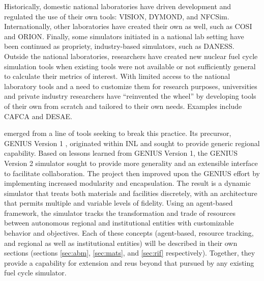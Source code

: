 Historically, domestic national laboratories have driven development and
regulated the use of their own tools:
\gls{VISION}\cite{jacobson_verifiable_2010},
\gls{DYMOND}\cite{yacout_modeling_2005}, and
\gls{NFCSim}\cite{schneider_nfcsim:_2005,allan_guidance_2008}.  Internationally,
other laboratories have created their own as well, such as
\gls{COSI}\cite{boucher_cosi_2005,boucher_cosi:_2006,meyer_new_2009,coquelet-pascal_comparison_2011}
and ORION\cite{worrall_scenario_2007}.  Finally, some simulators initiated in a national lab setting have
been continued as propriety, industry-based simulators, such as
\gls{DANESS}\cite{van_den_durpel_daness_2009}.  Outside the national laboratories,
researchers have created new nuclear fuel cycle simulation tools when existing
tools were not available or not sufficiently general to calculate their metrics
of interest.  With limited access to the
national laboratory tools and a need to customize them for research purposes,
universities and private industry researchers have ``reinvented the wheel'' by
developing tools of their own from scratch and tailored to their own needs.
Examples include \gls{CAFCA}\cite{guerin_benchmark_2009} and
\gls{DESAE}\cite{andrianova_desae_2008,mccarthy_benchmark_2012,allan_guidance_2008}.

\Cyclus emerged from a line of tools seeking to break this practice.  Its
precursor, \gls{GENIUS} Version 1
\cite{dunzik-gougar_global_2007,jain_transitioning_2006}, originated within
\gls{INL} and sought to provide generic regional capability.  Based on lessons
learned from \gls{GENIUS} Version 1, the \gls{GENIUS} Version 2
\cite{oliver_studying_2009,huff_geniusv2_2009} simulator sought to provide more
generality and an extensible interface to facilitate collaboration.  The \Cyclus
project then improved upon the \gls{GENIUS} effort by implementing increased
modularity and encapsulation.  The result is a dynamic simulator that treats
both materials and facilities discretely, with an architecture that permits
multiple and variable levels of fidelity. Using an agent-based framework, the
simulator tracks the transformation and trade of resources between autonomous
regional and institutional entities with customizable behavior and
objectives. Each of these concepts (agent-based, resource tracking, and
regional as well as institutional entities) will be described in their own
sections (sections \ref{sec:abm}, \ref{sec:mats}, and \ref{sec:rif}
respectively).  Together, they provide a capability for extension and reus
beyond that pursued by any existing fuel cycle simulator.


